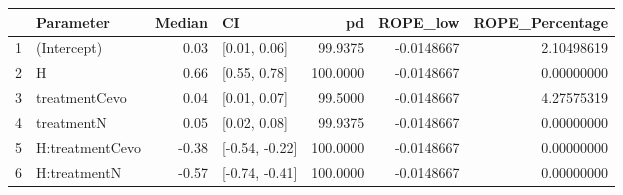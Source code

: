 \begin{table}[ht]
\centering
\begin{tabular}{llrlrrr}
  \hline
 & Parameter & Median & CI & pd & ROPE\_low & ROPE\_Percentage \\ 
  \hline
1 & (Intercept) & 0.03 & [0.01, 0.06] & 99.9375 & -0.0148667 & 2.10498619 \\ 
  2 & H & 0.66 & [0.55, 0.78] & 100.0000 & -0.0148667 & 0.00000000 \\ 
  3 & treatmentCevo & 0.04 & [0.01, 0.07] & 99.5000 & -0.0148667 & 4.27575319 \\ 
  4 & treatmentN & 0.05 & [0.02, 0.08] & 99.9375 & -0.0148667 & 0.00000000 \\ 
  5 & H:treatmentCevo & -0.38 & [-0.54, -0.22] & 100.0000 & -0.0148667 & 0.00000000 \\ 
  6 & H:treatmentN & -0.57 & [-0.74, -0.41] & 100.0000 & -0.0148667 & 0.00000000 \\ 
   \hline
\end{tabular}
\end{table}

